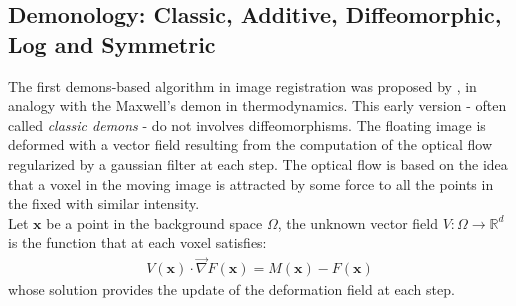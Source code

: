 \subsection{Demonology: Classic, Additive, Diffeomorphic, Log and Symmetric}

The first demons-based algorithm in image registration was proposed by \cite{thirion1998image}, in analogy with the Maxwell's demon in thermodynamics. This early version - often called \emph{classic demons} - do not involves diffeomorphisms. The floating image is deformed with a vector field resulting from the computation of the optical flow regularized by a gaussian filter at each step. The optical flow is based on the idea that a voxel in the moving image is attracted by some force to all the points in the fixed with similar intensity. \\
Let $\mathbf{x}$ be a point in the background space $\Omega$, the unknown vector field $V:\Omega \rightarrow \mathbb{R}^{d}$ is the function that at each voxel satisfies:
\begin{align}\label{eq:optical_flow_initial}
V(\mathbf{x})\cdot \vec{\nabla}F(\mathbf{x}) = M(\mathbf{x}) - F(\mathbf{x})
\end{align}
whose solution provides the update of the deformation field at each step.\\

